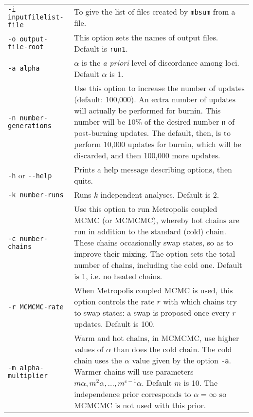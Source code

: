 \documentclass[12pt,english,final,letterpaper]{article}
\begin{document}
\bigskip

\noindent
\hspace*{-.2in}
\begin{tabular}{l|p{4.6in}}
{\tt -i inputfilelist-file}&To give the list of files created by {\tt mbsum} 
from a file.\\
{\tt -o output-file-root}&This option sets the names of output 
files. Default is {\tt run1}.\\
{\tt -a alpha}&$\alpha$ is the {\it a priori} level of discordance among 
loci. Default $\alpha$ is 1.\\
{\tt -n number-generations}&Use this option to increase the number of 
updates (default: 100,000). An extra number of updates will actually be 
performed for burnin. This number will be 10\% of the desired number {\tt n} 
of post-burning updates. The default, then, is to perform 10,000 updates for 
burnin, which will be discarded, and then 100,000 more updates.\\
{\tt -h} or \verb+--help+&Prints a help message describing options,
then quits.\\
{\tt -k number-runs}&Runs $k$ independent analyses. Default is 2.\\
{\tt -c number-chains}&Use this option to run Metropolis coupled MCMC (or MCMCMC), 
whereby hot chains are run in addition to the standard (cold) chain. 
These chains occasionally swap states, so as to improve their mixing. 
The option sets the total number of chains, including the cold one. 
Default is 1, i.e. no heated chains.\\
{\tt -r MCMCMC-rate}&When Metropolis coupled MCMC is used, this option
controls the rate $r$ with which chains try to swap states: a swap
is proposed once every $r$ updates. Default is 100.\\
{\tt -m alpha-multiplier}&Warm and hot chains, in MCMCMC, use higher values 
of $\alpha$ than does the cold chain. The cold chain uses the $\alpha$ value 
given by the option {\tt -a}. Warmer chains will use parameters 
$m\alpha, m^2\alpha,\dots, m^{c-1}\alpha$. Default $m$ is 10.
The independence prior corresponds to $\alpha=\infty$ so MCMCMC is not used
with this prior.
\end{tabular}
\end{document}
